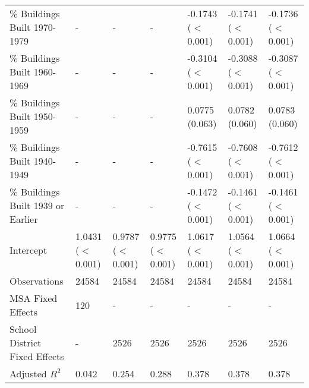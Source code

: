 \begin{landscape}
\begin{table}[h]
\begin{tabular}{l|llllll}
\% Buildings Built 1970-1979 &- & - & - & -0.1743 ($<$0.001) & -0.1741 ($<$0.001) & -0.1736 ($<$0.001) \\
\% Buildings Built 1960-1969 &- & - & - & -0.3104 ($<$0.001) & -0.3088 ($<$0.001) & -0.3087 ($<$0.001) \\
\% Buildings Built 1950-1959 &- & - & - & 0.0775 (0.063) & 0.0782 (0.060) & 0.0783 (0.060) \\
\% Buildings Built 1940-1949 &- & - & - & -0.7615 ($<$0.001) & -0.7608 ($<$0.001) & -0.7612 ($<$0.001) \\
\% Buildings Built 1939 or Earlier &- & - & - & -0.1472 ($<$0.001) & -0.1461 ($<$0.001) & -0.1461 ($<$0.001) \\
Intercept &1.0431 ($<$0.001) & 0.9787 ($<$0.001) & 0.9775 ($<$0.001) & 1.0617 ($<$0.001) & 1.0564 ($<$0.001) & 1.0664 ($<$0.001) \\
Observations &24584 & 24584 & 24584 & 24584 & 24584 & 24584 \\
MSA Fixed Effects &120 & - & - & - & - & - \\
School District Fixed Effects &- & 2526 & 2526 & 2526 & 2526 & 2526 \\
Adjusted $R^2$ &0.042 & 0.254 & 0.288 & 0.378 & 0.378 & 0.378 \\\hline
\end{tabular}
\end{table}
\newpage
\end{landscape}
\restoregeometry

